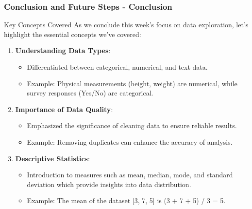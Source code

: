 \documentclass[aspectratio=169]{beamer}
\begin{document}
\begin{frame}[fragile]
    \frametitle{Conclusion and Future Steps - Conclusion}
    \begin{block}{Key Concepts Covered}
        As we conclude this week's focus on data exploration, let's highlight the essential concepts we've covered:
    \end{block}
    
    \begin{enumerate}
        \item \textbf{Understanding Data Types}:
        \begin{itemize}
            \item Differentiated between categorical, numerical, and text data.
            \item Example: Physical measurements (height, weight) are numerical, while survey responses (Yes/No) are categorical.
        \end{itemize}

        \item \textbf{Importance of Data Quality}:
        \begin{itemize}
            \item Emphasized the significance of cleaning data to ensure reliable results.
            \item Example: Removing duplicates can enhance the accuracy of analysis.
        \end{itemize}

        \item \textbf{Descriptive Statistics}:
        \begin{itemize}
            \item Introduction to measures such as mean, median, mode, and standard deviation which provide insights into data distribution.
            \item Example: The mean of the dataset [3, 7, 5] is (3 + 7 + 5) / 3 = 5.
        \end{itemize}
    \end{enumerate}
\end{frame}
\end{document}
